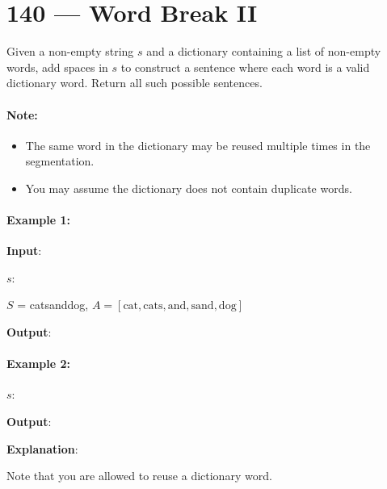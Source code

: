 \section{140 --- Word Break II}
Given a non-empty string $s$ and a dictionary  containing a list of non-empty words, add spaces in $s$ to construct a sentence where each word is a valid dictionary word. Return all such possible sentences.
\paragraph{Note:}
\begin{itemize}
\item The same word in the dictionary may be reused multiple times in the segmentation.
\item You may assume the dictionary does not contain duplicate words.
\end{itemize}
\paragraph{Example 1:}
\begin{flushleft}

\textbf{Input}: 

$s$: 


$S$ = catsanddog, $A = [\text{cat}, \text{cats}, \text{and}, \text{sand}, \text{dog}]$

\textbf{Output}:


\end{flushleft}

\paragraph{Example 2:}

\begin{flushleft}

$s$: 


\textbf{Output}:

\textbf{Explanation}: 

Note that you are allowed to reuse a dictionary word.
\end{flushleft}


